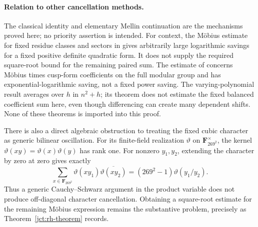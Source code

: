 \paragraph{Relation to other cancellation methods.}
The classical identity and elementary Mellin continuation are
the mechanisms proved here; no priority assertion is intended.
For context, the M\"obius estimate for fixed residue classes and
sectors in \cite[Lemma~5.2]{JCTLam} gives arbitrarily large
logarithmic savings for a fixed positive definite quadratic
form.  It does not supply the required square-root bound for
the remaining paired sum.
The estimate of \cite[Theorem~1.1]{JCTFG} concerns M\"obius
times cusp-form coefficients on the full modular group and
has exponential-logarithmic saving, not a fixed power saving.
The varying-polynomial result
\cite[Theorem~1.3]{JCTGMPP} averages over \(h\) in
\(n^2+h\); its theorem does not estimate the fixed balanced coefficient sum
here, even though differencing can create many dependent shifts.
None of these theorems is imported into this proof.

There is also a direct algebraic obstruction to treating the
fixed cubic character as generic bilinear oscillation.
For its finite-field realization \(\vartheta\) on
\(\mathbf F_{269^2}^{\times}\), the kernel
\(\vartheta(xy)=\vartheta(x)\vartheta(y)\) has rank one.
For nonzero \(y_1,y_2\), extending the character by zero at
zero gives exactly
\[
 \sum_{x\in\mathbf F_{269^2}}
 \vartheta(xy_1)\overline{\vartheta(xy_2)}
 =(269^2-1)\vartheta(y_1/y_2).
\]
Thus a generic Cauchy--Schwarz argument in the product variable
does not produce off-diagonal character cancellation.
Obtaining a square-root estimate for the remaining M\"obius
expression remains the substantive problem, precisely as
Theorem~\ref{jct:rh-theorem} records.
